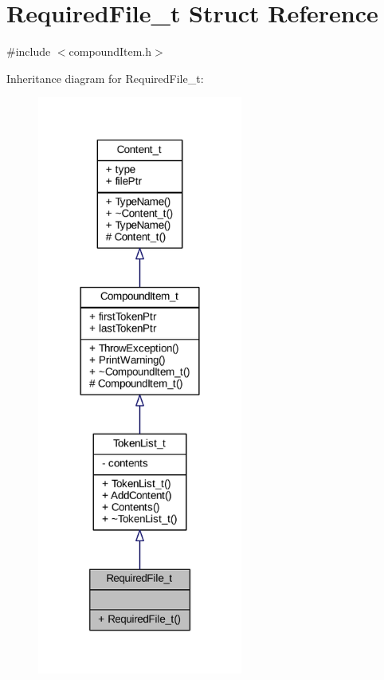 \hypertarget{struct_required_file__t}{}\section{Required\+File\+\_\+t Struct Reference}
\label{struct_required_file__t}


{\ttfamily \#include $<$compound\+Item.\+h$>$}



Inheritance diagram for Required\+File\+\_\+t\+:
\nopagebreak
\begin{figure}[H]
\begin{center}
\leavevmode
\includegraphics[width=191pt]{struct_required_file__t__inherit__graph}
\end{center}
\end{figure}


